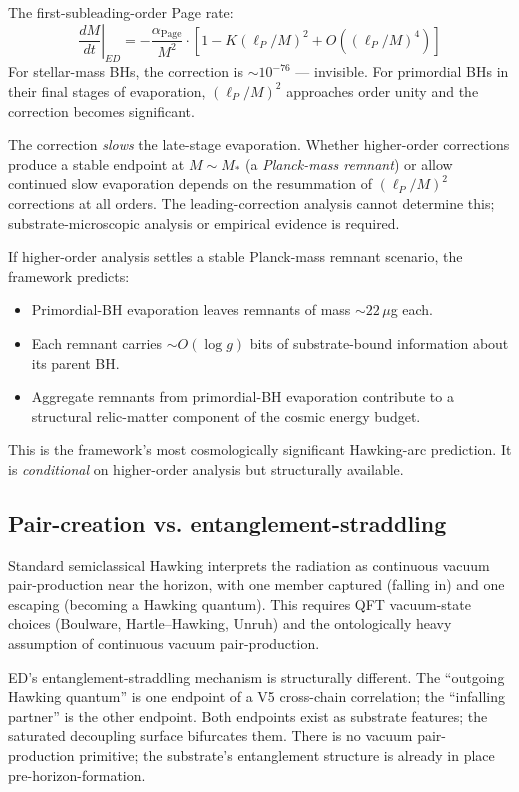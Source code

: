 \documentclass[11pt,a4paper]{article}
\begin{document}
The first-subleading-order Page rate:
\[
\left.\frac{dM}{dt}\right|_{ED} = -\frac{\alpha_{\mathrm{Page}}}{M^{2}} \cdot [1 - K(\ell_P/M)^{2} + O((\ell_P/M)^4)]
\]
For stellar-mass BHs, the correction is $\sim 10^{-76}$ --- invisible. For primordial BHs in their final stages of evaporation, $(\ell_P/M)^2$ approaches order unity and the correction becomes significant.

The correction \emph{slows} the late-stage evaporation. Whether higher-order corrections produce a stable endpoint at $M \sim M_*$ (a \emph{Planck-mass remnant}) or allow continued slow evaporation depends on the resummation of $(\ell_P/M)^2$ corrections at all orders. The leading-correction analysis cannot determine this; substrate-microscopic analysis or empirical evidence is required.

If higher-order analysis settles a stable Planck-mass remnant scenario, the framework predicts:
\begin{itemize}[noitemsep]
  \item Primordial-BH evaporation leaves remnants of mass $\sim 22\,\mu$g each.
  \item Each remnant carries $\sim O(\log g)$ bits of substrate-bound information about its parent BH.
  \item Aggregate remnants from primordial-BH evaporation contribute to a structural relic-matter component of the cosmic energy budget.
\end{itemize}

This is the framework's most cosmologically significant Hawking-arc prediction. It is \emph{conditional} on higher-order analysis but structurally available.

\subsection{Pair-creation vs. entanglement-straddling}

Standard semiclassical Hawking interprets the radiation as continuous vacuum pair-production near the horizon, with one member captured (falling in) and one escaping (becoming a Hawking quantum). This requires QFT vacuum-state choices (Boulware, Hartle--Hawking, Unruh) and the ontologically heavy assumption of continuous vacuum pair-production.

ED's entanglement-straddling mechanism is structurally different. The ``outgoing Hawking quantum'' is one endpoint of a V5 cross-chain correlation; the ``infalling partner'' is the other endpoint. Both endpoints exist as substrate features; the saturated decoupling surface bifurcates them. There is no vacuum pair-production primitive; the substrate's entanglement structure is already in place pre-horizon-formation.
\end{document}
